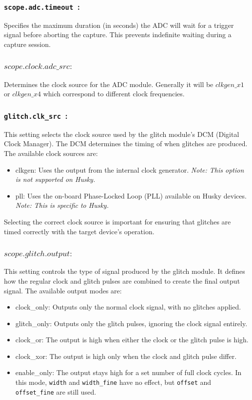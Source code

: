 \subsubsection{\textbf{\texttt{scope.adc.timeout }:}}
  
Specifies the maximum duration (in seconds) the ADC will wait for a trigger signal before aborting the capture. This prevents indefinite waiting during a capture session.
\subsubsection{$scope.clock.adc\_src :$}

Determines the clock source for the  ADC  module. Generally it will be $clkgen\_x1$ or $clkgen\_x4$ which correspond to different clock frequencies.
\subsubsection{\textbf{\texttt{glitch.clk\_src }:}}

This setting selects the clock source used by the glitch module's DCM (Digital Clock Manager). The DCM determines the timing of when glitches are produced.
The available clock sources are:

\begin{itemize}
  \item clkgen: Uses the output from the internal clock generator. \textit{Note: This option is not supported on Husky.}
  \item pll: Uses the on-board Phase-Locked Loop (PLL) available on Husky devices. \textit{Note: This is specific to Husky.}
\end{itemize}

Selecting the correct clock source is important for ensuring that glitches are timed correctly with the target device’s operation.
\subsubsection{$scope.glitch.output :$}
This setting controls the type of signal produced by the glitch module. It defines how the regular clock and glitch pulses are combined to create the final output signal.
The available output modes are:

\begin{itemize}
  \item clock\_only: Outputs only the normal clock signal, with no glitches applied.
  \item glitch\_only: Outputs only the glitch pulses, ignoring the clock signal entirely.
  \item clock\_or: The output is high when either the clock or the glitch pulse is high.
  \item clock\_xor: The output is high only when the clock and glitch pulse differ.
  \item enable\_only: The output stays high for a set number of full clock cycles. In this mode, \texttt{width} and \texttt{width\_fine} have no effect, but \texttt{offset} and \texttt{offset\_fine} are still used.
\end{itemize}

